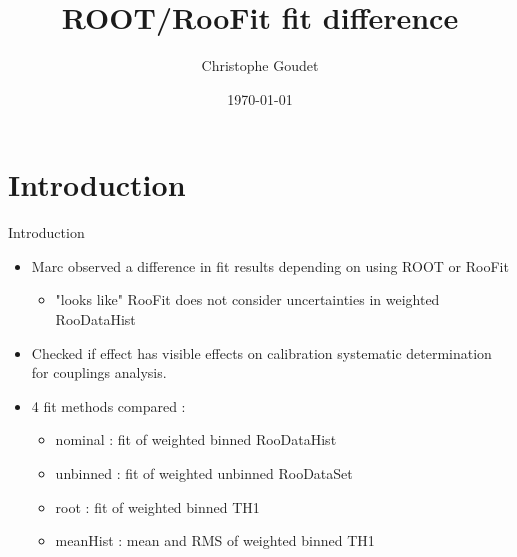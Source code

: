 \documentclass[bigger]{beamer}
\author{Christophe Goudet}
\date{\today}
\title{ROOT/RooFit fit difference}
\begin{document}
\maketitle

\section{Introduction}
\label{sec:org292386b}
\begin{frame}[label={sec:org5d0baf9}]{Introduction}
\begin{itemize}
\item Marc observed a difference in fit results depending on using ROOT or RooFit
\begin{itemize}
\item "looks like" RooFit does not consider uncertainties in weighted RooDataHist
\end{itemize}
\item Checked if effect has visible effects on calibration systematic determination for couplings analysis.
\item 4 fit methods compared :
\begin{itemize}
\item nominal : fit of weighted binned RooDataHist
\item unbinned : fit of weighted unbinned RooDataSet
\item root : fit of weighted binned TH1
\item meanHist : mean and RMS of weighted binned TH1
\end{itemize}
\end{itemize}
\end{frame}
\end{document}
